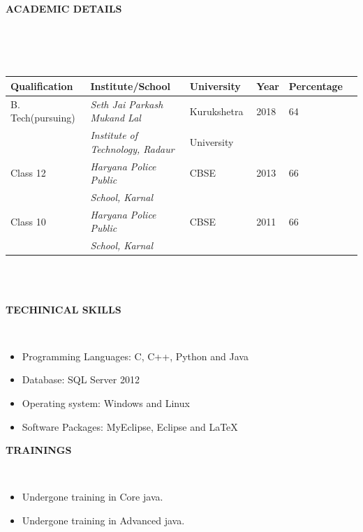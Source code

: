 \documentclass[a4paper,10pt]{article}
\newcommand{\lsep}{-0.5cm}
\newcommand{\resheading}[1]{{\small \colorbox{mygrey}{\begin{minipage}{0.975\textwidth}{\textbf{#1 \vphantom{p\^{E}}}}\end{minipage}}}}
\begin{document}
\resheading{\textbf{ACADEMIC DETAILS} }\\[\lsep]
\\ \\
\indent \begin{tabular}{ l @{\hskip 0.45in} l @{\hskip 0.45in} l @{\hskip 0.45in} l @{\hskip 0.35in}  l @{\hskip 0.35in}l }

\hline
\textbf{Qualification} & \textbf{Institute/School} & \textbf{University} & \textbf{Year} & \textbf{Percentage} \\
\hline

B. Tech(pursuing)\,\, & \textit{Seth Jai Parkash Mukand Lal}\,\, & Kurukshetra\,\, & 2018\,\, & 64 \\

& \textit{Institute of Technology, Radaur}\,\, & University \\

Class 12\,\, & \textit{Haryana Police Public}\,\, & CBSE\,\, & 2013\,\, & 66\\
& \textit{School, Karnal}\\

Class 10\,\, & \textit{Haryana Police Public}\,\, & CBSE\,\, & 2011\,\, & 66\\
& \textit{School, Karnal}\\

\hline
\end{tabular}
\\ \\

\resheading{\textbf{TECHINICAL SKILLS} }\\[\lsep]
\begin{itemize}
\item \noindent Programming Languages: C, C++, Python and Java
\item \noindent Database: SQL Server 2012 
\item \noindent Operating system: Windows and Linux
\item \noindent Software Packages: MyEclipse, Eclipse and \LaTeX

\end{itemize}

\resheading{\textbf{TRAININGS} }\\[\lsep]
\begin{itemize}
\item \noindent Undergone training in Core java.
\item \noindent Undergone training in Advanced java.
\end{itemize}
\end{document}
